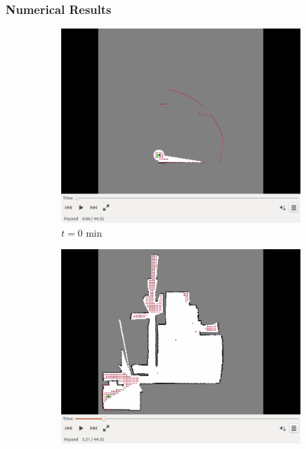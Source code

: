 \documentclass[11pt,professionalfonts,hyperref={pdftex,pdfpagemode=none,pdfstartview=FitH}]{beamer}
\begin{document}
\begin{frame}
\frametitle{Numerical Results}

\begin{figure}[!ht]
    \centering
    \begin{subfigure}[t]{0.2\columnwidth}
        \centering
        \includegraphics[trim = {4.6cm 3.8cm 4.6cm 0}, clip, width=\textwidth]{0min.png}
        \caption*{$t=0$ min}
        \label{fig:IRL0min}
    \end{subfigure}
    \begin{subfigure}[t]{0.2\columnwidth}
        \centering
        \includegraphics[trim = {4.6cm 3.8cm 4.6cm 0}, clip, width=\textwidth]{5min.png}

\end{subfigure}
\end{figure}
\end{frame}
\end{document}

